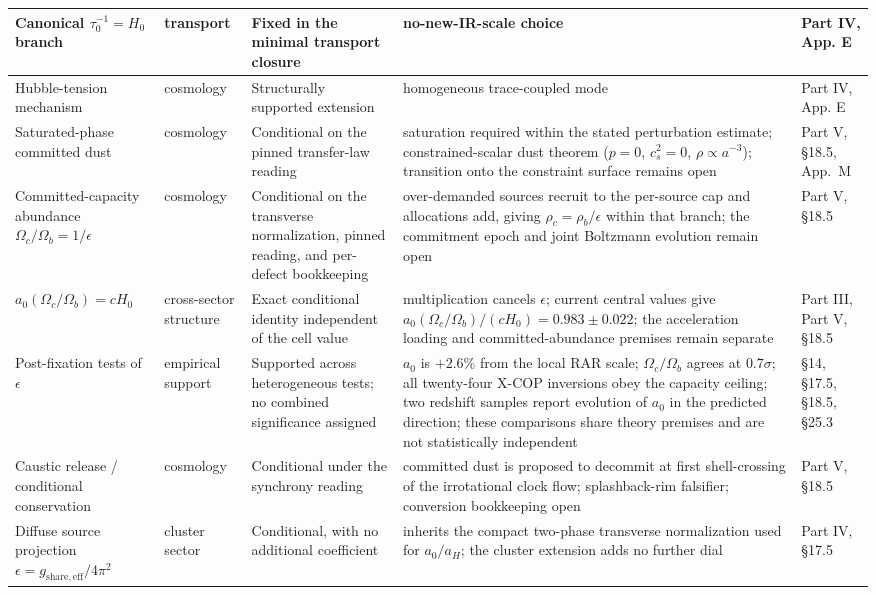 \documentclass[11pt]{article}
\begin{document}
\begin{longtable}{|L{0.18\textwidth}|L{0.13\textwidth}|L{0.16\textwidth}|L{0.33\textwidth}|L{0.13\textwidth}|}
\hline
Canonical $\tau_0^{-1}=H_0$ branch & transport & Fixed in the minimal transport closure & no-new-IR-scale choice & Part IV, App. E \\
\hline
Hubble-tension mechanism & cosmology & Structurally supported extension & homogeneous trace-coupled mode & Part IV, App. E \\
\hline
Saturated-phase committed dust & cosmology & Conditional on the pinned transfer-law reading & saturation required within the stated perturbation estimate; constrained-scalar dust theorem ($p=0$, $c_s^2=0$, $\rho\propto a^{-3}$); transition onto the constraint surface remains open & Part V, \S18.5, App.~M \\
\hline
Committed-capacity abundance $\Omega_c/\Omega_b=1/\epsilon$ & cosmology & Conditional on the transverse normalization, pinned reading, and per-defect bookkeeping & over-demanded sources recruit to the per-source cap and allocations add, giving $\rho_c=\rho_b/\epsilon$ within that branch; the commitment epoch and joint Boltzmann evolution remain open & Part V, \S18.5 \\
\hline
$a_0(\Omega_c/\Omega_b)=cH_0$ & cross-sector structure & Exact conditional identity independent of the cell value & multiplication cancels $\epsilon$; current central values give $a_0(\Omega_c/\Omega_b)/(cH_0)=0.983\pm0.022$; the acceleration loading and committed-abundance premises remain separate & Part III, Part V, \S18.5 \\
\hline
Post-fixation tests of $\epsilon$ & empirical support & Supported across heterogeneous tests; no combined significance assigned & $a_0$ is $+2.6\%$ from the local RAR scale; $\Omega_c/\Omega_b$ agrees at $0.7\sigma$; all twenty-four X-COP inversions obey the capacity ceiling; two redshift samples report evolution of $a_0$ in the predicted direction; these comparisons share theory premises and are not statistically independent & \S14, \S17.5, \S18.5, \S25.3 \\
\hline
Caustic release / conditional conservation & cosmology & Conditional under the synchrony reading & committed dust is proposed to decommit at first shell-crossing of the irrotational clock flow; splashback-rim falsifier; conversion bookkeeping open & Part V, \S18.5 \\
\hline
Diffuse source projection $\epsilon=g_{\mathrm{share,eff}}/4\pi^2$ & cluster sector & Conditional, with no additional coefficient & inherits the compact two-phase transverse normalization used for $a_0/a_H$; the cluster extension adds no further dial & Part IV, \S17.5 \\

\end{longtable}
\end{document}
